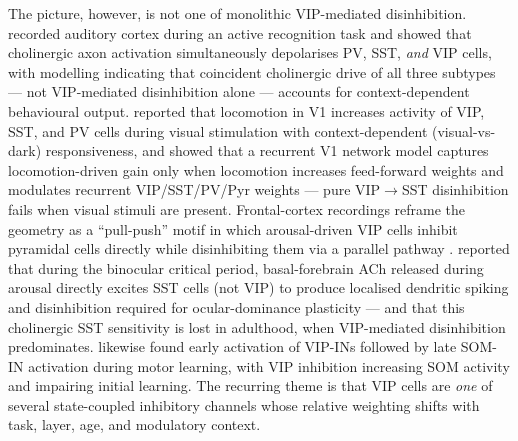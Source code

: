 \documentclass[11pt]{article}
\let\origrightarrow\rightarrow
\def\rightarrow{\ensuremath{\origrightarrow}}
\begin{document}
The picture, however, is not one of monolithic VIP-mediated disinhibition. \citet{Kuchibhotla2017} recorded auditory cortex during an active recognition task and showed that cholinergic axon activation simultaneously depolarises PV, SST, \textit{and} VIP cells, with modelling indicating that coincident cholinergic drive of all three subtypes --- not VIP-mediated disinhibition alone --- accounts for context-dependent behavioural output. \citet{Pakan2016} reported that locomotion in V1 increases activity of VIP, SST, and PV cells during visual stimulation with context-dependent (visual-vs-dark) responsiveness, and \citet{Dipoppa2018} showed that a recurrent V1 network model captures locomotion-driven gain only when locomotion increases feed-forward weights and modulates recurrent VIP/SST/PV/Pyr weights --- pure VIP\rightarrow SST disinhibition fails when visual stimuli are present. Frontal-cortex recordings reframe the geometry as a ``pull-push'' motif in which arousal-driven VIP cells inhibit pyramidal cells directly while disinhibiting them via a parallel pathway \citep{Garciajuncoclemente2017}. \citet{Yaeger2019} reported that during the binocular critical period, basal-forebrain ACh released during arousal directly excites SST cells (not VIP) to produce localised dendritic spiking and disinhibition required for ocular-dominance plasticity --- and that this cholinergic SST sensitivity is lost in adulthood, when VIP-mediated disinhibition predominates. \citet{Ren2022} likewise found early activation of VIP-INs followed by late SOM-IN activation during motor learning, with VIP inhibition increasing SOM activity and impairing initial learning. The recurring theme is that VIP cells are \textit{one} of several state-coupled inhibitory channels whose relative weighting shifts with task, layer, age, and modulatory context.
\end{document}
